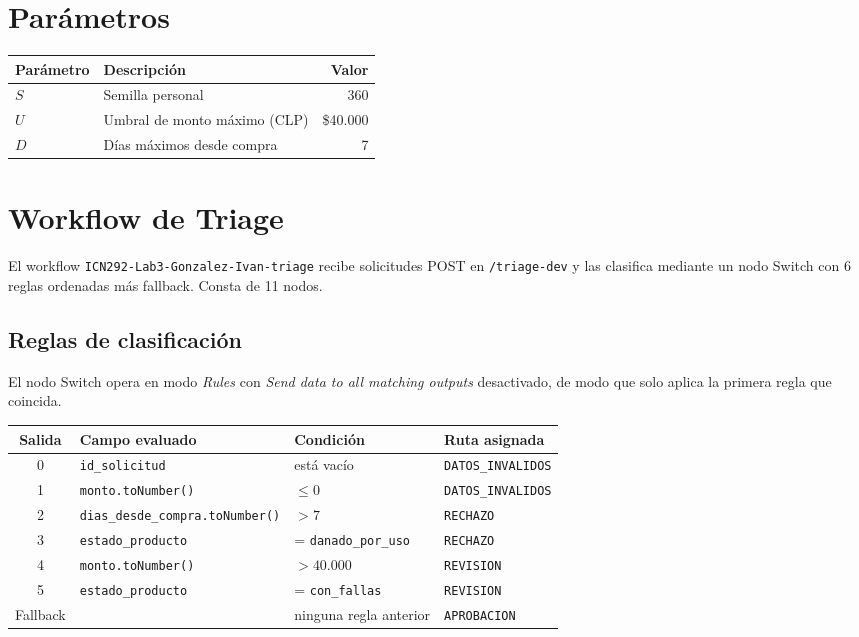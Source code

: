 \documentclass[12pt,a4paper]{article}
\begin{document}
\section{Par\'ametros}

\begin{center}
\begin{tabular}{llr}
\toprule
Par\'ametro & Descripci\'on & Valor \\
\midrule
$S$ & Semilla personal & 360 \\
$U$ & Umbral de monto m\'aximo (CLP) & \$40.000 \\
$D$ & D\'ias m\'aximos desde compra & 7 \\
\bottomrule
\end{tabular}
\end{center}

\section{Workflow de Triage}

El workflow \texttt{ICN292-Lab3-Gonzalez-Ivan-triage} recibe solicitudes POST en \texttt{/triage-dev} y las clasifica mediante un nodo Switch con 6 reglas ordenadas m\'as fallback. Consta de 11 nodos.

\subsection{Reglas de clasificaci\'on}

El nodo Switch opera en modo \textit{Rules} con \textit{Send data to all matching outputs} desactivado, de modo que solo aplica la primera regla que coincida.

\begin{center}
\begin{tabular}{clll}
\toprule
Salida & Campo evaluado & Condici\'on & Ruta asignada \\
\midrule
0 & \texttt{id\_solicitud} & est\'a vac\'io & \texttt{DATOS\_INVALIDOS} \\
1 & \texttt{monto.toNumber()} & $\leq 0$ & \texttt{DATOS\_INVALIDOS} \\
2 & \texttt{dias\_desde\_compra.toNumber()} & $> 7$ & \texttt{RECHAZO} \\
3 & \texttt{estado\_producto} & = \texttt{danado\_por\_uso} & \texttt{RECHAZO} \\
4 & \texttt{monto.toNumber()} & $> 40.000$ & \texttt{REVISION} \\
5 & \texttt{estado\_producto} & = \texttt{con\_fallas} & \texttt{REVISION} \\
Fallback & & ninguna regla anterior & \texttt{APROBACION} \\
\bottomrule
\end{tabular}
\end{center}
\end{document}
